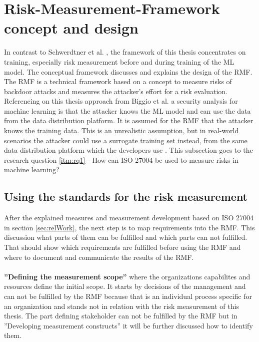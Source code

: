 
\section{Risk-Measurement-Framework concept and design}
\label{sec:conFrame}

In contrast to Schwerdtner et al. \cite{DBLP:journals/corr/abs-2011-04328}, the framework of this thesis concentrates on training, especially risk measurement before and during training of the ML model. The conceptual framework discusses and explains the design of the RMF. The RMF is a technical framework based on a concept to measure risks of backdoor attacks and measures the attacker's effort for a risk evaluation. \\ Referencing on this thesis approach from Biggio et al. \cite{DBLP:conf/icml/BiggioNL12} a security analysis for machine learning is that the attacker knows the ML model and can use the data from the data distribution platform. It is assumed for the RMF that the attacker knows the training data. This is an unrealistic assumption, but in real-world scenarios the attacker could use a surrogate training set instead, from the same data distribution platform which the developers use \cite{DBLP:journals/ml/BarrenoNJT10}. This subsection goes to the research question \ref{itm:rq1} - How can ISO 27004 be used to measure risks in machine learning?

\subsection{Using the standards for the risk measurement}
\label{sec:standard}

After the explained measures and measurement development based on ISO 27004 in section \ref{sec:relWork}, the next step is to map requirements into the RMF. This discussion what parts of them can be fulfilled and which parts can not fulfilled. That should show which requirements are fulfilled before using the RMF and where to document and communicate the results of the RMF. \\ \\

\textbf{''Defining the measurement scope''} where the organizations capabilites and resources define the initial scope. It starts by decisions of the management and can not be fulfilled by the RMF because that is an individual process specific for an organization and stands not in relation with the risk measurement of this thesis. The part defining stakeholder can not be fulfilled by the RMF but in ''Developing measurement constructs'' it will be further discussed how to identify them.  \\ \\

